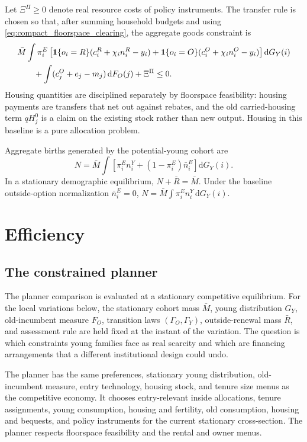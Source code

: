 \documentclass[11pt]{article}
\newcommand{\dd}{\mathrm d}
\newcommand{\1}{\mathbf 1}
\begin{document}
Let $\Xi^\Pi\ge0$ denote real resource costs of policy instruments. The transfer rule is chosen so that, after summing household budgets and using \eqref{eq:compact_floorspace_clearing}, the aggregate goods constraint is
\begin{align*}
&\bar M\int
\pi_i^E
\left[
\1\{o_i=R\}(c_i^R+\chi_i n_i^R-y_i)
+
\1\{o_i=O\}(c_i^O+\chi_i n_i^O-y_i)
\right]\dd G_Y(i)
\notag\\
&\qquad
+
\int(c_j^O+e_j-m_j)\,\dd F_O(j)
+\Xi^\Pi
\le0.
\end{align*}
Housing quantities are disciplined separately by floorspace feasibility: housing payments are transfers that net out against rebates, and the old carried-housing term $q H_j^0$ is a claim on the existing stock rather than new output. Housing in this baseline is a pure allocation problem.

Aggregate births generated by the potential-young cohort are
\[
N
=
\bar M\int
\left[
\pi_i^E n_i^Y+(1-\pi_i^E)\bar n_i^E
\right]
\dd G_Y(i).
\]
In a stationary demographic equilibrium, $N+\bar R=\bar M$. Under the baseline outside-option normalization $\bar n_i^E=0$, $N=\bar M\int\pi_i^E n_i^Y\,\dd G_Y(i)$.

\section{Efficiency}
\label{sec:efficiency}

\subsection{The constrained planner}

The planner comparison is evaluated at a stationary competitive equilibrium. For the local variations below, the stationary cohort mass $\bar M$, young distribution $G_Y$, old-incumbent measure $F_O$, transition laws $(\Gamma_O,\Gamma_Y)$, outside-renewal mass $\bar R$, and assessment rule are held fixed at the instant of the variation. The question is which constraints young families face as real scarcity and which are financing arrangements that a different institutional design could undo.

The planner has the same preferences, stationary young distribution, old-incumbent measure, entry technology, housing stock, and tenure size menus as the competitive economy. It chooses entry-relevant inside allocations, tenure assignments, young consumption, housing and fertility, old consumption, housing and bequests, and policy instruments for the current stationary cross-section. The planner respects floorspace feasibility and the rental and owner menus.
\end{document}
